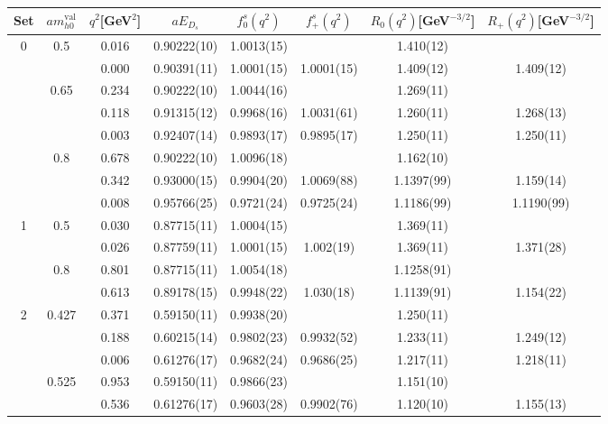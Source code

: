 \begin{table}
  \begin{center}
    \begin{tabular}{ c c c c c c c c }
      \hline
      Set & $am_{h0}^{\text{val}}$ & $q^2$[GeV$^2$]& $aE_{D_s}$& $f^s_0(q^2)$& $f^s_+(q^2)$& $R_0(q^2)$[GeV$^{-3/2}$]& $R_+(q^2)$[GeV$^{-3/2}$]\\ [0.5ex]
      \hline\hline 
      0 & 0.5 & 0.016 & 0.90222(10) & 1.0013(15) &  & 1.410(12) & \\ [0.5ex]
      &  & 0.000 & 0.90391(11) & 1.0001(15) & 1.0001(15) & 1.409(12) & 1.409(12)\\ [0.5ex]
      \hline 
      & 0.65 & 0.234 & 0.90222(10) & 1.0044(16) &  & 1.269(11) & \\ [0.5ex]
      &  & 0.118 & 0.91315(12) & 0.9968(16) & 1.0031(61) & 1.260(11) & 1.268(13)\\ [0.5ex]
      &  & 0.003 & 0.92407(14) & 0.9893(17) & 0.9895(17) & 1.250(11) & 1.250(11)\\ [0.5ex]
      \hline 
      & 0.8 & 0.678 & 0.90222(10) & 1.0096(18) &  & 1.162(10) & \\ [0.5ex]
      &  & 0.342 & 0.93000(15) & 0.9904(20) & 1.0069(88) & 1.1397(99) & 1.159(14)\\ [0.5ex]
      &  & 0.008 & 0.95766(25) & 0.9721(24) & 0.9725(24) & 1.1186(99) & 1.1190(99)\\ [0.5ex]
      \hline\hline 
      1 & 0.5 & 0.030 & 0.87715(11) & 1.0004(15) &  & 1.369(11) & \\ [0.5ex]
      &  & 0.026 & 0.87759(11) & 1.0001(15) & 1.002(19) & 1.369(11) & 1.371(28)\\ [0.5ex]
      \hline 
      & 0.8 & 0.801 & 0.87715(11) & 1.0054(18) &  & 1.1258(91) & \\ [0.5ex]
      &  & 0.613 & 0.89178(15) & 0.9948(22) & 1.030(18) & 1.1139(91) & 1.154(22)\\ [0.5ex]
      \hline\hline 
      2 & 0.427 & 0.371 & 0.59150(11) & 0.9938(20) &  & 1.250(11) & \\ [0.5ex]
      &  & 0.188 & 0.60215(14) & 0.9802(23) & 0.9932(52) & 1.233(11) & 1.249(12)\\ [0.5ex]
      &  & 0.006 & 0.61276(17) & 0.9682(24) & 0.9686(25) & 1.217(11) & 1.218(11)\\ [0.5ex]
      \hline 
      & 0.525 & 0.953 & 0.59150(11) & 0.9866(23) &  & 1.151(10) & \\ [0.5ex]
      &  & 0.536 & 0.61276(17) & 0.9603(28) & 0.9902(76) & 1.120(10) & 1.155(13)\\ [0.5ex]

\end{tabular}
\end{center}
\end{table}

